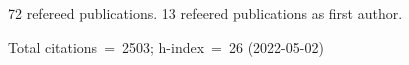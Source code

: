 72 refereed publications. 13 refeered publications as first author.

Total citations~=~2503; h-index~=~26 (2022-05-02)